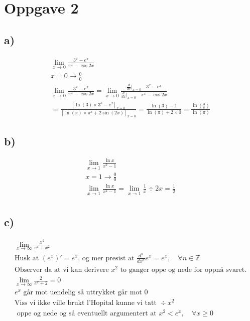 \documentclass[12pt]{article}
\begin{document}
\break
\section*{Oppgave 2}
\subsection*{a)}
\begin{gather*}
  \lim_{x\to0} \frac{3^x-e^x}{\pi^x-\cos{2x}} \\ 
  x = 0 \rightarrow \frac{0}{0} \\ 
  \lim_{x\to0} \frac{3^x-e^x}{\pi^x-\cos{2x}}
  = \lim_{x\to0}\frac{\frac{d}{dx}|_{x=0} \quad 3^x - e^x}
  {\frac{d}{dx}|_{x=0} \quad \pi^x - \cos{2x}}
  \\ 
  = \frac{[\ln(3) \times 3^x - e^x]_{x=0}}{[\ln(\pi) \times \pi^x + 2\sin(2x)]_{x=0}}
  = \frac{\ln(3) - 1}{\ln(\pi) + 2 \times 0} 
  = \boxed{\frac{\ln(\frac{3}{e})}{\ln(\pi)}}
\end{gather*}

\subsection*{b)}
\begin{gather*}
  \lim_{x\to1} \frac{\ln x}{x^2-1} \\ 
  x = 1 \rightarrow \frac{0}{0} \\ 
  \lim_{x\to1} \frac{\ln x}{x^2-1} = \lim_{x\to1} \frac{1}{x} \div 2x 
  = \boxed{\frac{1}{2}} \\ 
\end{gather*}

\subsection*{c)}
\begin{gather*}
  \lim_{x\to\infty } \frac{x^2}{e^x+x^2} \\ 
  \text{Husk at } (e^x)' = e^x \text{, og mer presist at } 
  \frac{d^n}{dx^n} e^x = e^x, \quad \forall n \in \mathbb Z \\ 
  \text{Observer da at vi kan derivere } x^2 
  \text{ to ganger oppe og nede for oppnå svaret.} \\
  \lim_{x\to\infty}\frac{2}{e^x+2} = \boxed{0} \\ 
  e^x \text{ går mot uendelig så uttrykket går mot 0} \\
  \text{Viss vi ikke ville brukt l'Hopital kunne vi tatt } \div x^2 
  \\ \text{ oppe og nede 
  og så eventuellt argumentert at } x^2 < e^x, \quad \forall x \geq 0 
\end{gather*}
\end{document}
